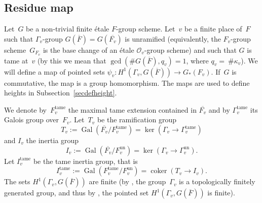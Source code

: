 \documentclass[a4paper,english,12pt]{amsart}
\newcommand{\oF}{\overline F}
\newcommand{\Fv}{F_v}
\newcommand{\Ov}{\mathcal O _v}
\DeclareMathOperator{\coker}{coker}
\DeclareMathOperator{\Gal}{Gal}
\DeclareMathOperator{\un}{un}
\DeclareMathOperator{\tame}{{tame}}
\numberwithin{equation}{subsection}
\begin{document}
\subsection{Residue map} Let~$G$ be a non-trivial finite \' etale $F$-group scheme. Let~$v$ be a finite place of~$F$ such that $\Gamma_v$-group $G(\oF)=G(\overline{F_v})$ is unramified (equivalently, the $\Fv$-group scheme~$G_{\Fv}$ is the base change of an \' etale $\Ov$-group scheme) and such that $G$ is tame at~$v$ (by this we mean that $\gcd(\#G(\oF),q_v)=1$, where $q_v=~\#\kappa_v$).  We will define a map of pointed sets $\psi_v:H^1(\Gamma_v, G(\oF))\to G_*(\Fv)$. If~$G$ is commutative, the map is a group homomorphism. The maps are used to define heights in Subsection~\ref{secdefheight}.

We denote by~$\Fv^{\tame}$ %
the maximal tame extension %
contained in $\overline{F_v}$ and by $\Gamma_v^{\tame}$ its Galois group over~$F_v$. %
Let~$T_v$ be the ramification group $$T_v:=\Gal(\overline{F_v}/\Fv^{\tame})=\ker(\Gamma_v\to\Gamma_v^{\tame})$$ and $I_v$ the inertia group $$I_v:=\Gal(\overline{\Fv}/\Fv^{\un})=\ker(\Gamma_v\to\Gamma_v^{\un}).$$ Let $I_v^{\tame}$ be the tame inertia group, that is $$I_v^{\tame}:=\Gal(F_v^{\tame}/F_v^{\un})=\coker(T_v\to I_v).$$
The sets %
$H^1(\Gamma_v, G(\oF))$ are finite (by \cite[Theorem 7.5.14]{CohomologyNF}, the group~$\Gamma_v$ is a topologically finitely generated group, and thus by \cite[Chapter III, \S 4, Proposition 9]{Cohomologiegalois}, the pointed set $H^1(\Gamma_v, G(\oF))$ is finite).
\end{document}
